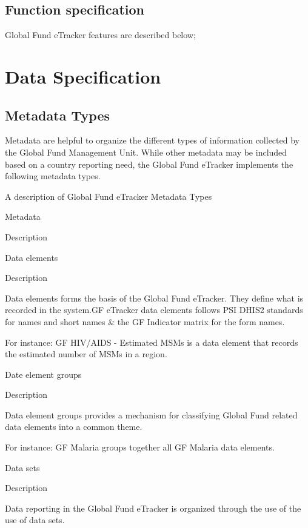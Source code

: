 \documentclass[]{book}
\begin{document}
\hypertarget{function-specification}{%
\section{Function specification}\label{function-specification}}

Global Fund eTracker features are described below;

\hypertarget{data-specification}{%
\chapter{Data Specification}\label{data-specification}}

\hypertarget{metadata-types}{%
\section{Metadata Types}\label{metadata-types}}

Metadata are helpful to organize the different types of information collected by the Global Fund Management Unit. While other metadata may be included based on a country reporting need, the Global Fund eTracker implements the following metadata types.

\label{tab:nice-tab}A description of Global Fund eTracker Metadata Types

Metadata

Description

Data elements

Description

Data elements forms the basis of the Global Fund eTracker. They define what is recorded in the system.GF eTracker data elements follows PSI DHIS2 standards for names and short names \& the GF Indicator matrix for the form names.

For instance: GF HIV/AIDS - Estimated MSMs is a data element that records the estimated number of MSMs in a region.

Date element groups

Description

Data element groups provides a mechanism for classifying Global Fund related data elements into a common theme.

For instance: GF Malaria groups together all GF Malaria data elements.

Data sets

Description

Data reporting in the Global Fund eTracker is organized through the use of the use of data sets.
\end{document}
